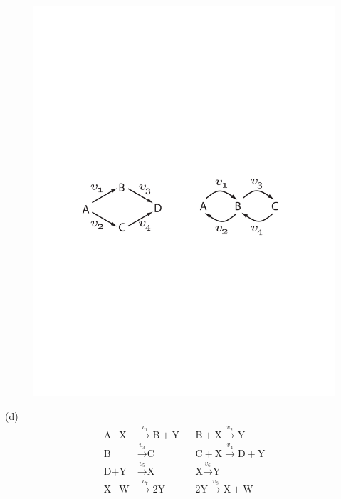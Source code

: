 \documentclass[12pt]{article}
\begin{document}
\begin{question}
\begin{figure}[H]
  \includegraphics[scale = 0.5]{NetStructExercises2}
\end{figure}
(d) \begin{align*}
\text{A} + \text{X} &\stackrel{v_1}{\longrightarrow} \text{B} + \text{Y} && \text{B} + \text{X} \stackrel{v_2}{\longrightarrow} \text{Y} \\[5pt]
\text{B} &\stackrel{v_3}{\longrightarrow} \text{C} && \text{C} + \text{X} \stackrel{v_4}{\longrightarrow} \text{D} + \text{Y} \\[5pt]
\text{D} + \text{Y} &\stackrel{v_5}{\longrightarrow} \text{X} && \text{X} \stackrel{v_6}{\longrightarrow} \text{Y} \\[5pt]
\text{X} + \text{W} &\stackrel{v_7}{\longrightarrow} 2 \text{Y} && 2 \text{Y} \stackrel{v_8}{\longrightarrow} \text{X} + \text{W} \\[5pt]
\end{align*}
%
\end{question}
\end{document}
